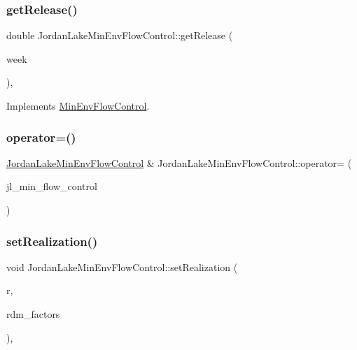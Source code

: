 \subsubsection{\texorpdfstring{get\+Release()}{getRelease()}}
{\footnotesize\ttfamily double Jordan\+Lake\+Min\+Env\+Flow\+Control\+::get\+Release (\begin{DoxyParamCaption}\item[{int}]{week }\end{DoxyParamCaption})\hspace{0.3cm}{\ttfamily [override]}, {\ttfamily [virtual]}}



Implements \mbox{\hyperlink{classMinEnvFlowControl_a5de79615852eb0c937dd559a9eb9402d_a5de79615852eb0c937dd559a9eb9402d}{Min\+Env\+Flow\+Control}}.

\mbox{\label{classJordanLakeMinEnvFlowControl_a939dc49f5e9a80a2f9a3c9c6bdce98fb_a939dc49f5e9a80a2f9a3c9c6bdce98fb}} 
\subsubsection{\texorpdfstring{operator=()}{operator=()}}
{\footnotesize\ttfamily \mbox{\hyperlink{classJordanLakeMinEnvFlowControl}{Jordan\+Lake\+Min\+Env\+Flow\+Control}} \& Jordan\+Lake\+Min\+Env\+Flow\+Control\+::operator= (\begin{DoxyParamCaption}\item[{const \mbox{\hyperlink{classJordanLakeMinEnvFlowControl}{Jordan\+Lake\+Min\+Env\+Flow\+Control}} \&}]{jl\+\_\+min\+\_\+flow\+\_\+control }\end{DoxyParamCaption})}

\mbox{\label{classJordanLakeMinEnvFlowControl_aa1e816121060212f3dbeffda90a7baec_aa1e816121060212f3dbeffda90a7baec}} 
\subsubsection{\texorpdfstring{set\+Realization()}{setRealization()}}
{\footnotesize\ttfamily void Jordan\+Lake\+Min\+Env\+Flow\+Control\+::set\+Realization (\begin{DoxyParamCaption}\item[{unsigned long}]{r,  }\item[{vector$<$ double $>$ \&}]{rdm\+\_\+factors }\end{DoxyParamCaption})\hspace{0.3cm}{\ttfamily [override]}, {\ttfamily [virtual]}}



